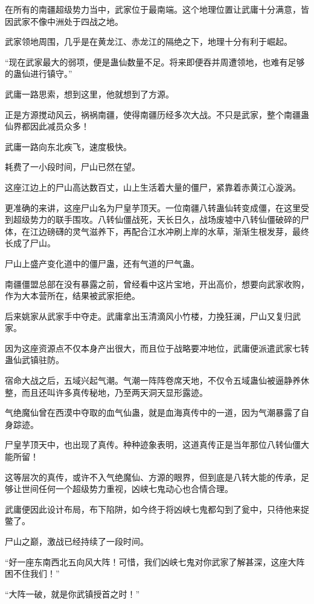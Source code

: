 \begin{this_body}
在所有的南疆超级势力当中，武家位于最南端。这个地理位置让武庸十分满意，皆因武家不像中洲处于四战之地。

武家领地周围，几乎是在黄龙江、赤龙江的隔绝之下，地理十分有利于崛起。

“现在武家最大的弱项，便是蛊仙数量不足。将来即便吞并周遭领地，也难有足够的蛊仙进行镇守。”

武庸一路思索，想到这里，他就想到了方源。

正是方源搅动风云，祸祸南疆，使得南疆历经多次大战。不只是武家，整个南疆蛊仙界都因此减员众多！

武庸一路向东北疾飞，速度极快。

耗费了一小段时间，尸山已然在望。

这座江边上的尸山高达数百丈，山上生活着大量的僵尸，紧靠着赤黄江心漩涡。

更准确的来讲，这座尸山名为尸皇芋顶天。一位南疆八转蛊仙转变成僵，在这里受到超级势力的联手围攻。八转仙僵战死，天长日久，战场废墟中八转仙僵破碎的尸体，在江边磅礴的灵气滋养下，再配合江水冲刷上岸的水草，渐渐生根发芽，最终长成了尸山。

尸山上盛产变化道中的僵尸蛊，还有气道的尸气蛊。

南疆僵盟总部在没有暴露之前，曾经看中这片宝地，开出高价，想要向武家收购，作为大本营所在，结果被武家拒绝。

后来姚家从武家手中夺走。武庸拿出玉清滴风小竹楼，力挽狂澜，尸山又复归武家。

因为这座资源点不仅本身产出很大，而且位于战略要冲地位，武庸便派遣武家七转蛊仙武镇驻防。

宿命大战之后，五域兴起气潮。气潮一阵阵卷席天地，不仅令五域蛊仙被逼静养休整，而且还叫许多真传秘地，乃至两天洞天显形露迹。

气绝魔仙曾在西漠中夺取的血气仙蛊，就是血海真传中的一道，因为气潮暴露了自身踪迹。

尸皇芋顶天中，也出现了真传。种种迹象表明，这道真传正是当年那位八转仙僵大能所留！

这等层次的真传，或许不入气绝魔仙、方源的眼界，但到底是八转大能的传承，足够让世间任何一个超级势力重视，凶峡七鬼动心也合情合理。

武庸便因此设计布局，布下陷阱，如今终于将凶峡七鬼都勾到了瓮中，只待他来捉鳖了。

尸山之巅，激战已经持续了一段时间。

“好一座东南西北五向风大阵！可惜，我们凶峡七鬼对你武家了解甚深，这座大阵困不住我们！”

“大阵一破，就是你武镇授首之时！”


\end{this_body}
